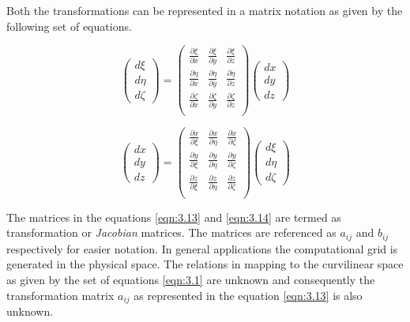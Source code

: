 Both the transformations can be represented in a matrix notation as given by the following set of equations.

\begin{equation}
\begin{pmatrix}
d\xi\\
d\eta\\
d\zeta
\end{pmatrix}
=
\begin{pmatrix}
\frac{\partial{\xi}}{\partial{x}} & \frac{\partial{\xi}}{\partial{y}} & \frac{\partial{\xi}}{\partial{z}}\\
\frac{\partial{\eta}}{\partial{x}} & \frac{\partial{\eta}}{\partial{y}} & \frac{\partial{\eta}}{\partial{z}}\\
\frac{\partial{\zeta}}{\partial{x}} & \frac{\partial{\zeta}}{\partial{y}} & \frac{\partial{\zeta}}{\partial{z}}\\
\end{pmatrix}
\begin{pmatrix}
dx\\
dy\\
dz
\end{pmatrix}
\label{eqn:3.13}
\end{equation}

\begin{equation}
\begin{pmatrix}
dx\\
dy\\
dz
\end{pmatrix}
=
\begin{pmatrix}
\frac{\partial{x}}{\partial{\xi}} & \frac{\partial{x}}{\partial{\eta}} & \frac{\partial{x}}{\partial{\zeta}}\\
\frac{\partial{y}}{\partial{\xi}} & \frac{\partial{y}}{\partial{\eta}} & \frac{\partial{y}}{\partial{\zeta}}\\
\frac{\partial{z}}{\partial{\xi}} & \frac{\partial{z}}{\partial{\eta}} & \frac{\partial{z}}{\partial{\zeta}}\\
\end{pmatrix}
\begin{pmatrix}
d\xi\\
d\eta\\
d\zeta
\end{pmatrix}
\label{eqn:3.14}
\end{equation}

The matrices in the equations \ref{eqn:3.13} and \ref{eqn:3.14} are termed as transformation or \textit{Jacobian} matrices. The matrices are referenced as $a_{ij}$ and $b_{ij}$ respectively for easier notation. In general applications the computational grid is generated in the physical space. The relations in mapping to the curvilinear space as given by the set of equations \ref{eqn:3.1} are unknown and consequently the transformation matrix $a_{ij}$ as represented in the equation \ref{eqn:3.13} is also unknown. 

